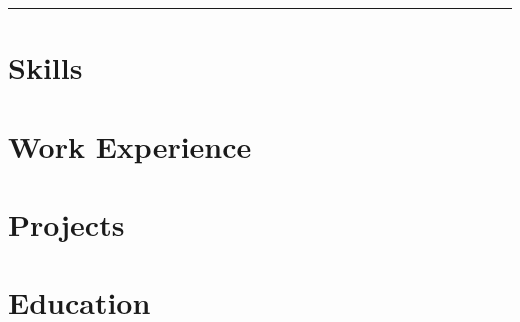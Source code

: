 \documentclass[a4paper,10pt]{article}
\begin{document}
\vspace{}
\noindent\leavevmode\color{highlight}\rule{\textwidth}{0.5pt}
\vspace{}



\section{Skills}


\section{Work Experience}


\section{Projects}


\section{Education}



% 
\end{document}
